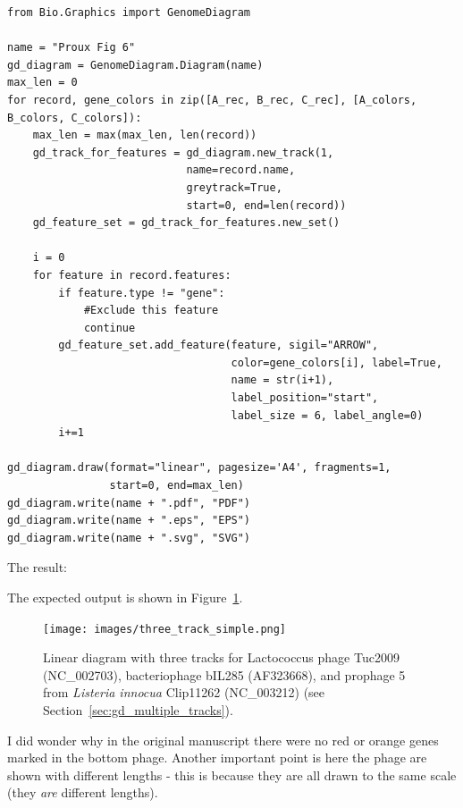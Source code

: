 \documentclass{report}
\begin{document}
\begin{verbatim}
from Bio.Graphics import GenomeDiagram

name = "Proux Fig 6"
gd_diagram = GenomeDiagram.Diagram(name)
max_len = 0
for record, gene_colors in zip([A_rec, B_rec, C_rec], [A_colors, B_colors, C_colors]):
    max_len = max(max_len, len(record))
    gd_track_for_features = gd_diagram.new_track(1,
                            name=record.name,
                            greytrack=True,
                            start=0, end=len(record))
    gd_feature_set = gd_track_for_features.new_set()

    i = 0
    for feature in record.features:
        if feature.type != "gene":
            #Exclude this feature                                                                                                   
            continue
        gd_feature_set.add_feature(feature, sigil="ARROW",
                                   color=gene_colors[i], label=True,
                                   name = str(i+1),
                                   label_position="start",
                                   label_size = 6, label_angle=0)
        i+=1

gd_diagram.draw(format="linear", pagesize='A4', fragments=1,
                start=0, end=max_len)
gd_diagram.write(name + ".pdf", "PDF")
gd_diagram.write(name + ".eps", "EPS")
gd_diagram.write(name + ".svg", "SVG")
\end{verbatim}

\begin{htmlonly}
\noindent The result:


\end{htmlonly}
\begin{latexonly}
\noindent The expected output is shown in Figure~\ref{fig:three_track_simple}.
\begin{figure}[htbp]
\centering
\texttt{[image: images/three\_track\_simple.png]}
\caption{Linear diagram with three tracks for Lactococcus phage Tuc2009
(NC\_002703), bacteriophage bIL285 (AF323668), and prophage 5 from
\textit{Listeria innocua} Clip11262 (NC\_003212)
(see Section~\ref{sec:gd_multiple_tracks}).}
\label{fig:three_track_simple}
\end{figure}
\end{latexonly}
I did wonder why in the original manuscript there were no red or orange genes
marked in the bottom phage. Another important point is here the phage are
shown with different lengths - this is because they are all drawn to the same
scale (they \emph{are} different lengths).
\end{document}
